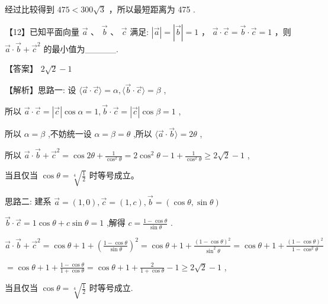 \documentclass[10pt]{article}
\begin{document}
经过比较得到 \({475} < {300}\sqrt{3}\) ，所以最短距离为 475 .

【12】已知平面向量 \(\overrightarrow{a}\text{ 、 }\overrightarrow{b}\text{ 、 }\overrightarrow{c}\) 满足: \(\left| \overrightarrow{a}\right|  = \left| \overrightarrow{b}\right|  = 1\) ， \(\overrightarrow{a} \cdot  \overrightarrow{c} = \overrightarrow{b} \cdot  \overrightarrow{c} = 1\) ，则 \(\overrightarrow{a} \cdot  \overrightarrow{b} + {\overrightarrow{c}}^{2}\) 的最小值为\_\_\_\_\_.

【答案】 \(2\sqrt{2} - 1\)

【解析】思路一: 设 \(\langle \overrightarrow{a} \cdot  \overrightarrow{c}\rangle  = \alpha ,\langle \overrightarrow{b} \cdot  \overrightarrow{c}\rangle  = \beta\) ,

所以 \(\overrightarrow{a} \cdot  \overrightarrow{c} = \left| \overrightarrow{c}\right| \cos \alpha  = 1,\overrightarrow{b} \cdot  \overrightarrow{c} = \left| \overrightarrow{c}\right| \cos \beta  = 1\) ,

所以 \(\alpha  = \beta\) ,不妨统一设 \(\alpha  = \beta  = \theta\) ,所以 \(\langle \overrightarrow{a} \cdot  \overrightarrow{b}\rangle  = {2\theta }\) ,

所以 \(\overrightarrow{a} \cdot  \overrightarrow{b} + {\overrightarrow{c}}^{2} = \cos {2\theta } + \frac{1}{{\cos }^{2}\theta } = 2{\cos }^{2}\theta  - 1 + \frac{1}{{\cos }^{2}\theta } \geq  2\sqrt{2} - 1\) ,

当且仅当 \(\cos \theta  = \sqrt[4]{\frac{1}{2}}\) 时等号成立。

思路二: 建系 \(\overrightarrow{a} = \left( {1,0}\right) ,\overrightarrow{c} = \left( {1,c}\right) ,\overrightarrow{b} = \left( {\cos \theta ,\sin \theta }\right)\)

\(\overrightarrow{b} \cdot  \overrightarrow{c} = 1\cos \theta  + c\sin \theta  = 1\) ,解得 \(c = \frac{1 - \cos \theta }{\sin \theta }\) .

\(\overrightarrow{a} \cdot  \overrightarrow{b} + {\overrightarrow{c}}^{2} = \cos \theta  + 1 + {\left( \frac{1 - \cos \theta }{\sin \theta }\right) }^{2} = \cos \theta  + 1 + \frac{{\left( 1 - \cos \theta \right) }^{2}}{{\sin }^{2}\theta } = \cos \theta  + 1 + \frac{{\left( 1 - \cos \theta \right) }^{2}}{1 - {\cos }^{2}\theta }\)

\(= \cos \theta  + 1 + \frac{1 - \cos \theta }{1 + \cos \theta } = \cos \theta  + 1 + \frac{2}{1 + \cos \theta } - 1 \geq  2\sqrt{2} - 1\) ,

当且仅当 \(\cos \theta  = \sqrt[4]{\frac{1}{2}}\) 时等号成立.
\end{document}

